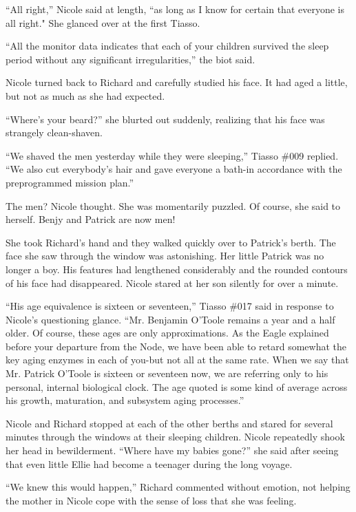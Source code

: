 \documentclass[]{article}
\begin{document}
{“All right,” Nicole said at length, “as long as I know for certain that everyone is all right."  She glanced over at the first Tiasso.

“All the monitor data indicates that each of your children survived the sleep period without any significant irregularities,” the biot said.

Nicole turned back to Richard and carefully studied his face.  It had aged a little, but not as much as she had expected.

“Where’s your beard?” she blurted out suddenly, realizing that his face was strangely clean-shaven.

“We shaved the men yesterday while they were sleeping,” Tiasso \#009 replied.  “We also cut everybody’s hair and gave everyone a bath-in accordance with the preprogrammed mission plan.”

The men? Nicole thought.  She was momentarily puzzled.  Of course, she said to herself.  Benjy and Patrick are now men!

She took Richard’s hand and they walked quickly over to Patrick’s berth.  The face she saw through the window was astonishing.  Her little Patrick was no longer a boy.  His features had lengthened considerably and the rounded contours of his face had disappeared.  Nicole stared at her son silently for over a minute.

“His age equivalence is sixteen or seventeen,” Tiasso \#017 said in response to Nicole’s questioning glance.  “Mr.  Benjamin O’Toole remains a year and a half older.  Of course, these ages are only approximations.  As the Eagle explained before your departure from the Node, we have been able to retard somewhat the key aging enzymes in each of you-but not all at the same rate.  When we say that Mr.  Patrick O’Toole is sixteen or seventeen now, we are referring only to his personal, internal biological clock.  The age quoted is some kind of average across his growth, maturation, and subsystem aging processes.”

Nicole and Richard stopped at each of the other berths and stared for several minutes through the windows at their sleeping children.  Nicole repeatedly shook her head in bewilderment.  “Where have my babies gone?” she said after seeing that even little Ellie had become a teenager during the long voyage.

“We knew this would happen,” Richard commented without emotion, not helping the mother in Nicole cope with the sense of loss that she was feeling.

}
\end{document}
